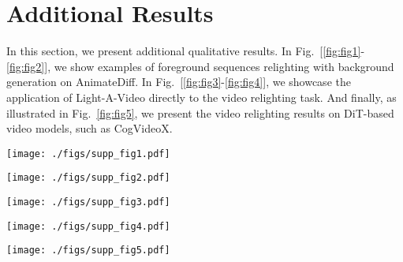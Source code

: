 \section{Additional Results}
In this section, we present additional qualitative results.
In Fig.~[\ref{fig:fig1}-\ref{fig:fig2}], we show examples of foreground sequences relighting with background generation on AnimateDiff.
In Fig.~[\ref{fig:fig3}-\ref{fig:fig4}], we showcase the application of Light-A-Video directly to the video relighting task. 
And finally, as illustrated in Fig.~\ref{fig:fig5}, we present the video relighting results on DiT-based video models, such as CogVideoX.

\begin{figure*}[htbp]
    \centering
    \texttt{[image: ./figs/supp\_fig1.pdf]}
    \caption{\textbf{More results of Light-A-Video in foreground sequences relighting with background generation.}}
    \label{fig:fig1}
\end{figure*}

\begin{figure*}[htbp]
    \centering
    \texttt{[image: ./figs/supp\_fig2.pdf]}
    \caption{\textbf{More results of Light-A-Video in foreground sequences relighting with background generation.}}
    \label{fig:fig2}
\end{figure*}

\begin{figure*}[htbp]
    \centering
    \texttt{[image: ./figs/supp\_fig3.pdf]}
    \caption{\textbf{More results of Light-A-Video in video sequences relighting.}}
    \label{fig:fig3}
\end{figure*}

\begin{figure*}[htbp]
    \centering
    \texttt{[image: ./figs/supp\_fig4.pdf]}
    \caption{\textbf{More results of Light-A-Video in video sequences relighting.}}
    \label{fig:fig4}
\end{figure*}

\begin{figure*}[htbp]
    \centering
    \texttt{[image: ./figs/supp\_fig5.pdf]}
    \caption{\textbf{More results of Light-A-Video in video sequences relighting on CogVideoX.}}
    \label{fig:fig5}
\end{figure*}


